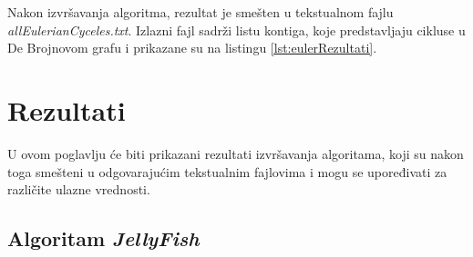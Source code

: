 \documentclass[12pt,oneside]{memoir}
\begin{document}


Nakon izvršavanja algoritma, rezultat je smešten u tekstualnom fajlu \textit{allEulerianCyceles.txt}. Izlazni fajl sadrži listu kontiga, koje predstavljaju cikluse u De Brojnovom grafu i prikazane su na listingu \ref{lst:eulerRezultati}.



\newpage

\section{Rezultati}
\label{odeljak:Rezultati}

U ovom poglavlju će biti prikazani rezultati izvršavanja algoritama, koji su nakon toga smešteni u odgovarajućim tekstualnim fajlovima i mogu se upoređivati za različite ulazne vrednosti.

\subsection{Algoritam \textit{JellyFish}}
\label{pododeljak:jellyfish}



% 

\end{document}
